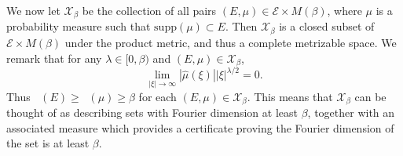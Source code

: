 \documentclass[dvipsnames,letterpaper,12pt]{article}
\numberwithin{equation}{section}
\DeclareMathOperator{\fordim}{\dim_{\mathbb{F}}}
\newtheorem{theorem}{Theorem}
\numberwithin{theorem}{section}
\begin{document}
We now let $\mathcal{X}_\beta$ be the collection of all pairs $(E,\mu) \in \mathcal{E} \times M(\beta)$, where $\mu$ is a probability measure such that $\text{supp}(\mu) \subset E$. Then $\mathcal{X}_\beta$ is a closed subset of $\mathcal{E} \times M(\beta)$ under the product metric, and thus a complete metrizable space. We remark that for any $\lambda \in [0,\beta)$ and $(E,\mu) \in \mathcal{X}_\beta$,
%
\begin{equation} \label{equationGFSCSC4}
    \lim_{|\xi| \to \infty} |\widehat{\mu}(\xi)| |\xi|^{\lambda/2} = 0.
\end{equation}
%
Thus $\fordim(E) \geq \fordim(\mu) \geq \beta$ for each $(E,\mu) \in \mathcal{X}_\beta$. This means that $\mathcal{X}_\beta$ can be thought of as describing sets with Fourier dimension at least $\beta$, together with an associated measure which provides a certificate proving the Fourier dimension of the set is at least $\beta$.

\begin{comment}
\begin{theorem}
    $\mathcal{X}$ is a closed subset of $\mathcal{E} \times M(\beta)$.
\end{theorem}
\begin{proof}
    Suppose $\{ (E_k,\mu_k) \}$ is a sequence of elements of $\mathcal{X}$ converging to some tuple $(E,\mu) \in \mathcal{E} \times M(\beta)$. Fix $\varepsilon > 0$. Since $E_k \to E$ in the Hausdorff dimension, there exists $k_0$ such that for $k \geq k_0$, $E_k \subset E(\varepsilon)$. Since $\mu_k \to \mu$ weakly, this implies that $\mu$ is a probability measure, and that $\text{supp}(\mu) \subset E(\varepsilon)$. Taking $\varepsilon \to 0$ shows that $\text{supp}(\mu) \subset E$. Again for a fixed $\varepsilon > 0$, applying the triangle inequality and the reverse triangle inequality combined with \eqref{equationGFSCSC4} applied to $\mu_k$, we conclude
    \[ \lim_{|\xi| \to \infty} |\xi|^{\beta/2 - \varepsilon} |\widehat{\mu}(\xi)| = \lim_{|\xi| \to \infty} |\xi|^{\beta/2 - \varepsilon} |\widehat{\mu}(\xi) - \widehat{\mu_k}(\xi)| \leq \| \mu - \mu_k \|_{M(\beta,\varepsilon)}. \]
    Taking $k \to \infty$ shows that
    \[ \lim_{|\xi| \to \infty} |\xi|^{\beta/2 - \varepsilon} |\widehat{\mu}(\xi)| = 0, \]
    which completes the proof.
\end{proof}
\end{comment}
\end{document}
